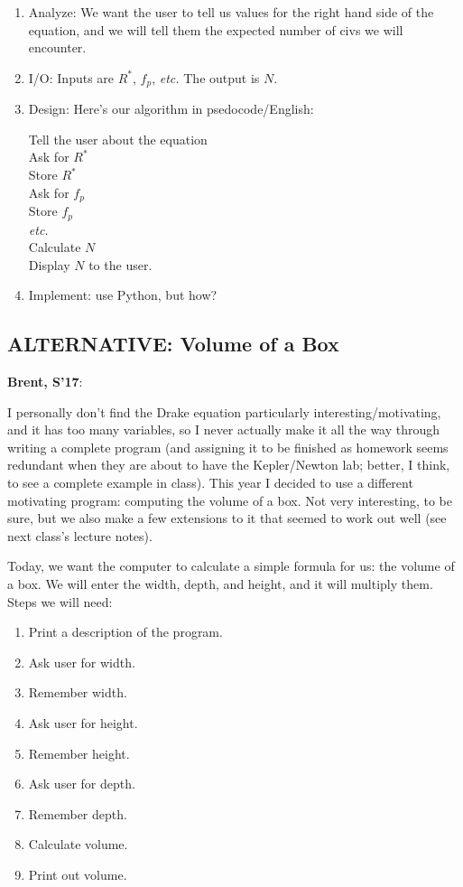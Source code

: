 \documentclass{article}
\newcommand{\etc}{\emph{etc.}\xspace}
\newenvironment{reflect}[1]
{
  \noindent
  \begin{lrbox}{\reflectbox}
    \begin{minipage}[t]{\textwidth}
      \textbf{#1}:
}{
    \end{minipage}
  \end{lrbox}
  \fbox{\usebox{\reflectbox}}
}
\begin{document}
\begin{enumerate}
\item Analyze: We want the user to tell us values for the right hand
  side of the equation, and we will tell them the expected number of
  civs we will encounter.

\item I/O: Inputs are $R^*$, $f_p$, \etc  The output is $N$.

\item Design: Here's our algorithm in psedocode/English:

  Tell the user about the equation \\
  Ask for $R^*$ \\
  Store $R^*$ \\
  Ask for $f_p$ \\
  Store $f_p$ \\
  \etc \\
  Calculate $N$ \\
  Display $N$ to the user.

\item Implement: use Python, but how?

\end{enumerate}

\subsection*{ALTERNATIVE: Volume of a Box}

\begin{reflect}{Brent, S'17}
  I personally don't find the Drake equation particularly
  interesting/motivating, and it has too many variables, so I never
  actually make it all the way through writing a complete program (and
  assigning it to be finished as homework seems redundant when they
  are about to have the Kepler/Newton lab; better, I think, to see a
  complete example in class).  This year I decided to use a different
  motivating program: computing the volume of a box. Not very
  interesting, to be sure, but we also make a few extensions to it
  that seemed to work out well (see next class's lecture notes).
\end{reflect}

Today, we want the computer to calculate a simple formula for us: the
volume of a box.  We will enter the width, depth, and height, and it
will multiply them.  Steps we will need:

\begin{enumerate}
\item Print a description of the program.
\item Ask user for width.
\item Remember width.
\item Ask user for height.
\item Remember height.
\item Ask user for depth.
\item Remember depth.
\item Calculate volume.
\item Print out volume.
\end{enumerate}
\end{document}
